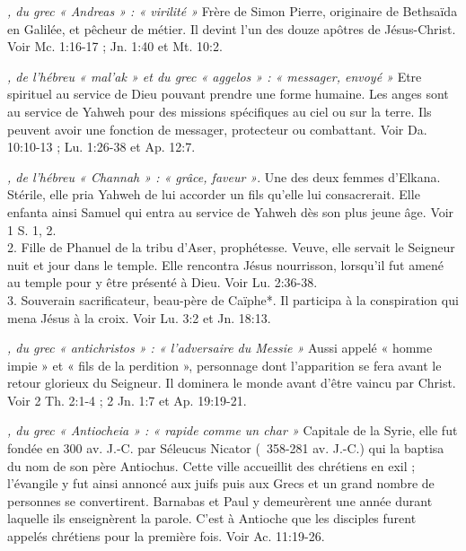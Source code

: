 \begin{multicols}{2}
{\textit{, du grec « Andreas » : « virilité »}\newline
Frère de Simon Pierre, originaire de Bethsaïda en Galilée, et pêcheur de métier. Il devint l'un des douze apôtres de Jésus-Christ. Voir Mc. 1:16-17 ; Jn. 1:40 et Mt. 10:2.

\textit{, de l'hébreu « mal'ak » et du grec « aggelos » : « messager, envoyé »}\newline
Etre spirituel au service de Dieu pouvant prendre une forme humaine. Les anges sont au service de Yahweh pour des missions spécifiques au ciel ou sur la terre. Ils peuvent avoir une fonction de messager, protecteur ou combattant. Voir Da. 10:10-13 ; Lu. 1:26-38 et Ap. 12:7.

\textit{, de l'hébreu « Channah » : « grâce, faveur »}. Une des deux femmes d'Elkana. Stérile, elle pria Yahweh de lui accorder un fils qu'elle lui consacrerait. Elle enfanta ainsi Samuel qui entra au service de Yahweh dès son plus jeune âge. Voir 1 S. 1, 2.
\\2. Fille de Phanuel de la tribu d'Aser, prophétesse. Veuve, elle servait le Seigneur nuit et jour dans le temple. Elle rencontra Jésus nourrisson, lorsqu'il fut amené au temple pour y être présenté à Dieu. Voir Lu. 2:36-38.
\\3. Souverain sacrificateur, beau-père de Caïphe*. Il participa à la conspiration qui mena Jésus à la croix. Voir Lu. 3:2 et Jn. 18:13.

\textit{, du grec « antichristos » : « l'adversaire du Messie »}\newline
Aussi appelé « homme impie » et « fils de la perdition », personnage dont l'apparition se fera avant le retour glorieux du Seigneur. Il dominera le monde avant d'être vaincu par Christ. Voir 2 Th. 2:1-4 ; 2 Jn. 1:7 et Ap. 19:19-21.

\textit{, du grec « Antiocheia » : « rapide comme un char »}\newline
Capitale de la Syrie, elle fut fondée en 300 av. J.-C. par Séleucus Nicator (\ 358-281 av. J.-C.) qui la baptisa du nom de son père Antiochus. Cette ville accueillit des chrétiens en exil ; l'évangile y fut ainsi annoncé aux juifs puis aux Grecs et un grand nombre de personnes se convertirent. Barnabas et Paul y demeurèrent une année durant laquelle ils enseignèrent la parole. C'est à Antioche que les disciples furent appelés chrétiens pour la première fois. Voir Ac. 11:19-26.

}
\end{multicols}
